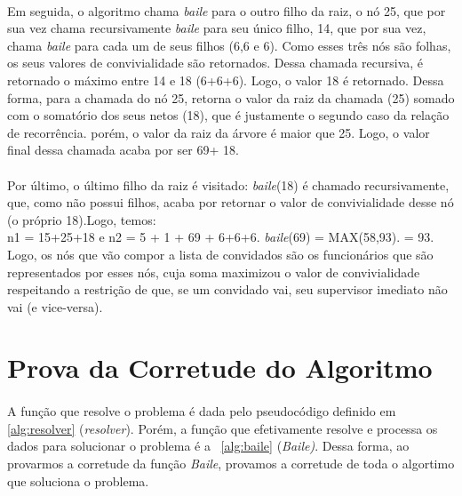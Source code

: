 \documentclass[a4paper]{article}
\begin{document}
\paragraph{}Em seguida, o algoritmo chama \emph{baile} para o outro filho da raiz, o nó 25, que por sua vez chama recursivamente \emph{baile} para seu único filho, 14, que por sua vez, chama \emph{baile} para cada um de seus filhos (6,6 e 6). Como esses três nós são folhas, os seus valores de convivialidade são retornados. Dessa chamada recursiva, é retornado o máximo entre 14 e 18 (6+6+6). Logo, o valor 18 é retornado. Dessa forma, para a chamada do nó 25, retorna o valor da raiz da chamada (25) somado com o somatório dos seus netos (18), que é justamente o segundo caso da relação de recorrência. porém, o valor da raiz da árvore é maior que 25. Logo, o valor final dessa chamada acaba por ser 69+ 18.\\

\paragraph{}Por último, o último filho da raiz é visitado: \emph{baile}(18) é chamado recursivamente, que, como não possui filhos, acaba por retornar o valor de convivialidade desse nó (o próprio 18).Logo, temos:\\
n1 = 15+25+18 e n2 = 5 + 1 + 69 + 6+6+6.
\emph{baile}(69) = MAX(58,93). = 93. Logo, os nós que vão compor a lista de convidados são os funcionários que são representados por esses nós, cuja soma maximizou o valor de convivialidade respeitando a restrição de que, se um convidado vai, seu supervisor imediato não vai (e vice-versa).\\

\newpage
\section{Prova da Corretude do Algoritmo}

\paragraph{}A função que resolve o problema é dada pelo pseudocódigo definido em \ref{alg:resolver} (\emph{resolver}). Porém, a função que efetivamente resolve e processa os dados para solucionar o problema é a ~\ref{alg:baile} (\emph{Baile)}. Dessa forma, ao provarmos a corretude da função \emph{Baile}, provamos a corretude de toda o algortimo que soluciona o problema.\\
\end{document}
